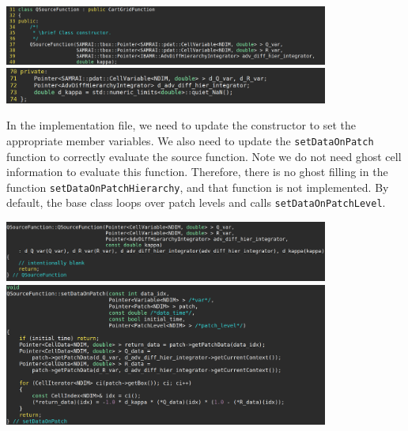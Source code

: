 \documentclass{article}
\begin{document}
\begin{center}
\includegraphics[width=0.8\textwidth]{Graphs/NS-ex5/add_src/header_update_constructor.png} \\
\vspace{0.5em}
\includegraphics[width=0.8\textwidth]{Graphs/NS-ex5/add_src/header_update_member_vars.png}
\end{center}

In the implementation file, we need to update the constructor to set the appropriate member variables. We also need to update the \verb|setDataOnPatch| function to correctly evaluate the source function. Note we do not need ghost cell information to evaluate this function. Therefore, there is no ghost filling in the function \verb|setDataOnPatchHierarchy|, and that function is not implemented. By default, the base class loops over patch levels and calls \verb|setDataOnPatchLevel|.
\begin{center}
\includegraphics[width=0.8\textwidth]{Graphs/NS-ex5/add_src/source_constructor.png} \\
\vspace{0.5em}
\includegraphics[width=0.8\textwidth]{Graphs/NS-ex5/add_src/source_setDataOnPatch.png}
\end{center}
\end{document}
